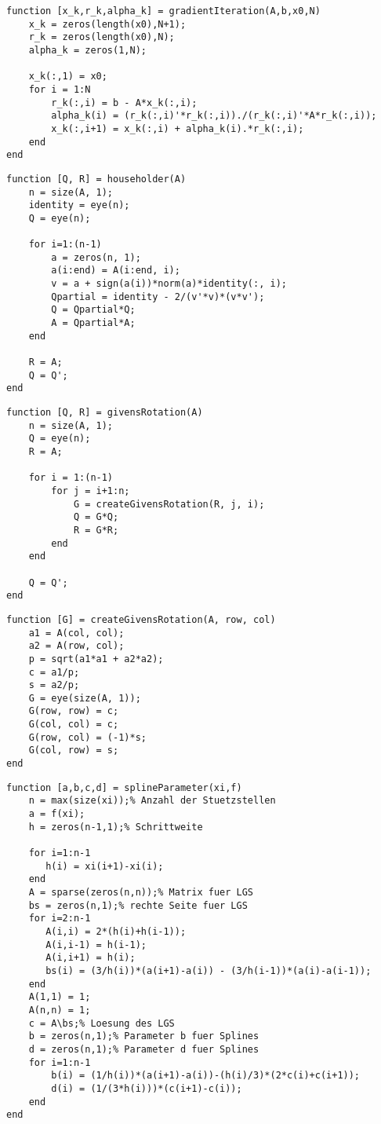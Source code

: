 \documentclass[german]{latex4ei/latex4ei_sheet}
\begin{document}
\begin{lstlisting}
function [x_k,r_k,alpha_k] = gradientIteration(A,b,x0,N)
    x_k = zeros(length(x0),N+1);
    r_k = zeros(length(x0),N);
    alpha_k = zeros(1,N);

    x_k(:,1) = x0;
    for i = 1:N
        r_k(:,i) = b - A*x_k(:,i);
        alpha_k(i) = (r_k(:,i)'*r_k(:,i))./(r_k(:,i)'*A*r_k(:,i));
        x_k(:,i+1) = x_k(:,i) + alpha_k(i).*r_k(:,i);
    end
end
\end{lstlisting}

\begin{lstlisting}
function [Q, R] = householder(A)
    n = size(A, 1);
    identity = eye(n);
    Q = eye(n);

    for i=1:(n-1)
        a = zeros(n, 1);
        a(i:end) = A(i:end, i);
        v = a + sign(a(i))*norm(a)*identity(:, i);
        Qpartial = identity - 2/(v'*v)*(v*v');
        Q = Qpartial*Q;
        A = Qpartial*A;
    end

    R = A;
    Q = Q';
end
\end{lstlisting}

\begin{lstlisting}
function [Q, R] = givensRotation(A)
    n = size(A, 1);
    Q = eye(n);
    R = A;

    for i = 1:(n-1)
        for j = i+1:n;
            G = createGivensRotation(R, j, i);
            Q = G*Q;
            R = G*R;
        end
    end

    Q = Q';
end
\end{lstlisting}

\begin{lstlisting}
function [G] = createGivensRotation(A, row, col)
    a1 = A(col, col);
    a2 = A(row, col);
    p = sqrt(a1*a1 + a2*a2);
    c = a1/p;
    s = a2/p;
    G = eye(size(A, 1));
    G(row, row) = c;
    G(col, col) = c;
    G(row, col) = (-1)*s;
    G(col, row) = s;
end
\end{lstlisting}

\begin{lstlisting}
function [a,b,c,d] = splineParameter(xi,f)
	n = max(size(xi));% Anzahl der Stuetzstellen
	a = f(xi);
    h = zeros(n-1,1);% Schrittweite

    for i=1:n-1
       h(i) = xi(i+1)-xi(i);
    end
    A = sparse(zeros(n,n));% Matrix fuer LGS
    bs = zeros(n,1);% rechte Seite fuer LGS
    for i=2:n-1
       A(i,i) = 2*(h(i)+h(i-1));
       A(i,i-1) = h(i-1);
       A(i,i+1) = h(i);
       bs(i) = (3/h(i))*(a(i+1)-a(i)) - (3/h(i-1))*(a(i)-a(i-1));
    end
    A(1,1) = 1;
    A(n,n) = 1;
    c = A\bs;% Loesung des LGS
    b = zeros(n,1);% Parameter b fuer Splines
    d = zeros(n,1);% Parameter d fuer Splines
    for i=1:n-1
        b(i) = (1/h(i))*(a(i+1)-a(i))-(h(i)/3)*(2*c(i)+c(i+1));
        d(i) = (1/(3*h(i)))*(c(i+1)-c(i));
    end
end
\end{lstlisting}
\end{document}
